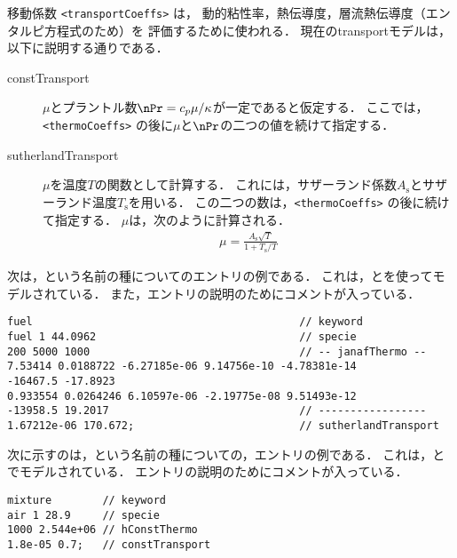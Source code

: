 移動係数 \verb|<transportCoeffs>| は，
動的粘性率，熱伝導度，層流熱伝導度（エンタルピ方程式のため）を
評価するために使われる．
現在のtransportモデルは，以下に説明する通りである．
\begin{description}
 \item[constTransport]
            $\mu$とプラントル数$\nPr = c_{p}\mu/\kappa$が一定であると仮定する．
            ここでは，\verb|<thermoCoeffs>| の後に$\mu$と$\nPr$の二つの値を続けて指定する．
 \item[sutherlandTransport]
            $\mu$を温度$T$の関数として計算する．
            これには，サザーランド係数$A_{\mathrm{s}}$とサザーランド温度$T_{\mathrm{s}}$を用いる．
            この二つの数は，\verb|<thermoCoeffs>| の後に続けて指定する．
            $\mu$は，次のように計算される．
\begin{align}
 \label{eq:7.2}
 \mu = \frac{A_{\mathrm{s}}\sqrt{T}}{1 + T_{\mathrm{s}}/T}
\end{align}
\end{description}
次は，という名前の種についてのエントリの例である．
これは，とを使ってモデルされている．
また，エントリの説明のためにコメントが入っている．
\begin{OFfile}
\begin{verbatim}
fuel                                          // keyword
fuel 1 44.0962                                // specie
200 5000 1000                                 // -- janafThermo --
7.53414 0.0188722 -6.27185e-06 9.14756e-10 -4.78381e-14
-16467.5 -17.8923
0.933554 0.0264246 6.10597e-06 -2.19775e-08 9.51493e-12
-13958.5 19.2017                              // -----------------
1.67212e-06 170.672;                          // sutherlandTransport
\end{verbatim}
\end{OFfile}
次に示すのは，という名前の種についての，エントリの例である．
これは，とでモデルされている．
エントリの説明のためにコメントが入っている．
\begin{OFfile}
\begin{verbatim}
mixture        // keyword
air 1 28.9     // specie
1000 2.544e+06 // hConstThermo
1.8e-05 0.7;   // constTransport
\end{verbatim}
\end{OFfile}



